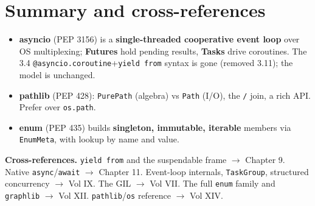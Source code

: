 \section{Summary and cross-references}

\begin{itemize}
  \item \textbf{asyncio} (PEP 3156) is a \textbf{single-threaded cooperative event loop} over OS
    multiplexing; \textbf{Futures} hold pending results, \textbf{Tasks} drive coroutines. The 3.4
    \texttt{@asyncio.coroutine}+\texttt{yield from} syntax is gone (removed 3.11); the model is
    unchanged.
  \item \textbf{pathlib} (PEP 428): \texttt{PurePath} (algebra) vs \texttt{Path} (I/O), the
    \texttt{/} join, a rich API. Prefer over \texttt{os.path}.
  \item \textbf{enum} (PEP 435) builds \textbf{singleton, immutable, iterable} members via
    \texttt{EnumMeta}, with lookup by name and value.
\end{itemize}

\textbf{Cross-references.} \texttt{yield from} and the suspendable frame $\rightarrow$ Chapter 9.
Native \texttt{async}/\texttt{await} $\rightarrow$ Chapter 11. Event-loop internals,
\texttt{TaskGroup}, structured concurrency $\rightarrow$ Vol IX. The GIL $\rightarrow$ Vol VII. The
full \texttt{enum} family and \texttt{graphlib} $\rightarrow$ Vol XII. \texttt{pathlib}/\texttt{os}
reference $\rightarrow$ Vol XIV.
